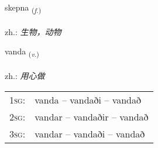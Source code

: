 \documentclass[frontgrid, backgrid]{flacards}\usepackage[]{graphicx}\usepackage[]{xcolor}
\begin{document}
\renewcommand{\blhead}{\vskip5pt {\small\bfseries\footnotesize Nafnorð | 名词 }}
\renewcommand{\bcfoot}{\vskip5pt \hspace{2pt}{\small\bfseries\footnotesize 3K}}


{skepna \small{\textsubscript{(\textit{f.})}} \\[1ex] %
\textphonetic{[scɛhpna]} \\
zh.: \emph{生物，动物} \\  [2ex]
\renewcommand*{\arraystretch}{0.8}
}

\renewcommand{\flhead}{\vskip5pt \fboxsep=0pt {\small\bfseries\footnotesize Sagnorð | 动词}}
\renewcommand{\fcfoot}{\vskip5pt \fboxsep=0pt \hspace{2pt}{\small\bfseries\footnotesize 3K}}

\renewcommand{\blhead}{\vskip5pt {\small\bfseries\footnotesize Sagnorð | 动词 }}
\renewcommand{\bcfoot}{\vskip5pt \hspace{2pt}{\small\bfseries\footnotesize 3K}}


{vanda \small{\textsubscript{(\textit{v.})}} \\[1ex] %
\textphonetic{[vanta]} \\
zh.: \emph{用心做} \\  [2ex]
\renewcommand*{\arraystretch}{0.8}
\begin{tabular}{p{1cm}l}
\textsc{1sg}: & vanda -- vandaði -- vandað \\ 
\textsc{2sg}: & vandar -- vandaðir -- vandað \\ 
\textsc{3sg}: & vandar -- vandaði -- vandað \\ 
\end{tabular}
}

\renewcommand{\flhead}{\vskip5pt \fboxsep=0pt {\small\bfseries\footnotesize Nafnorð | 名词}}
\renewcommand{\fcfoot}{\vskip5pt \fboxsep=0pt \hspace{2pt}{\small\bfseries\footnotesize 3K}}
\end{document}
